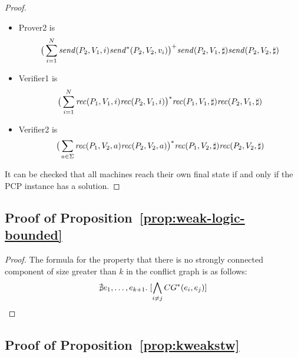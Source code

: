 \documentclass[a4paper,UKenglish,cleveref, autoref, thm-restate]{lipics-v2021}
\begin{document}
\begin{proof}
\begin{itemize}
\item Prover2 is $$\big(\sum_{i=1}^N\mathit{send}(P_2, V_1, i)\mathit{send}^*(P_2,V_2,v_i)\big)^+\mathit{send}(P_2, V_1, \sharp)\mathit{send}(P_2, V_2, \sharp)$$

\item Verifier1 is $$\big(\sum_{i=1}^N\mathit{rec}(P_1, V_1, i)\mathit{rec}(P_2, V_1, i)\big)^*\mathit{rec}(P_1, V_1, \sharp)\mathit{rec}(P_2, V_1, \sharp)$$

\item Verifier2 is $$\big(\sum_{a\in\Sigma}\mathit{rec}(P_1, V_2, a)\mathit{rec}(P_2, V_2, a)\big)^*\mathit{rec}(P_1, V_2, \sharp)\mathit{rec}(P_2, V_2, \sharp)$$

\end{itemize}

It can be checked that all machines reach their own final
state if and only if the PCP instance has a solution.
\end{proof}


\subsection{Proof of Proposition~\ref{prop:weak-logic-bounded}}


\weaklogicstw*

\begin{proof}
The formula for the property that there is no strongly connected component of size greater than $k$ in the conflict graph is as follows:
\begin{equation*}
	\nexists e_1, \ldots, e_{k+1} .\; [\bigwedge_{i \neq j} \XYformula{CG^*}(e_i, e_j)]
	\qedhere
\end{equation*}
\end{proof}


\subsection{Proof of Proposition~\ref{prop:kweakstw}}


\kweakstw*
\end{document}
